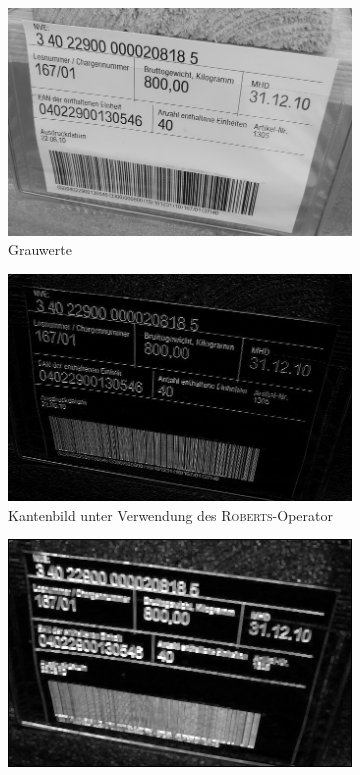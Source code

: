 \begin{figure}[H]
  \centering
  \begin{subfigure}[t]{.32\columnwidth}
    \centering
    \includegraphics[width=\columnwidth]{img/techniques/candidate-extraction/grayscale}
    \caption{\scriptsize Grauwerte}
  \end{subfigure}
  \begin{subfigure}[t]{.32\columnwidth}
    \centering
    \includegraphics[width=\columnwidth]{img/techniques/candidate-extraction/edges}
    \caption{\scriptsize Kantenbild unter Verwendung des \textsc{Roberts}-Operator}
  \end{subfigure}
  \begin{subfigure}[t]{.32\columnwidth}
    \centering
    \includegraphics[width=\columnwidth]{img/techniques/candidate-extraction/dilation}

\end{subfigure}
\end{figure}
